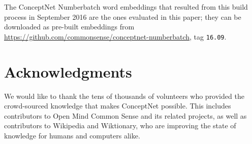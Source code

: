\documentclass[letterpaper]{article}
\begin{document}
The ConceptNet Numberbatch word embeddings that resulted from this build
process in September 2016 are the ones evaluated in this paper; they can be
downloaded as pre-built embeddings from
\url{https://github.com/commonsense/conceptnet-numberbatch}, tag {\tt 16.09}.

\section{Acknowledgments}

We would like to thank the tens of thousands of volunteers who provided the
crowd-sourced knowledge that makes ConceptNet possible. This includes
contributors to Open Mind Common Sense and its related projects, as well as
contributors to Wikipedia and Wiktionary, who are improving the state of
knowledge for humans and computers alike.



\end{document}
